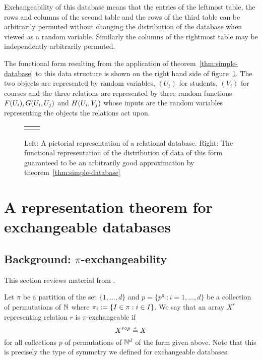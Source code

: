 Exchangeability of this database means that the entries of the leftmost table, the rows and columns of the second table and the rows of the third table can be arbitrarily permuted without changing the distribution of the database when viewed as a random variable.
Similarly the columns of the rightmost table may be independently arbitrarily permuted.

The functional form resulting from the application of theorem~\ref{thm:simple-database} to this data structure is shown on the right hand side of figure~\ref{fig:multi-rel-seq}.
The two objects are represented by \iid random variables, $(U_i)$ for students, $(V_i)$ for courses and the three relations are represented by three random functions $F(U_i),G(U_i,U_j)$ and $H(U_i,V_j)$ whose inputs are the random variables representing the objects the relations act upon.

\begin{figure}[ht]
\centering
\begin{tabular}{cc}
\tiny  & \tiny 
\end{tabular}
\caption{Left: A pictorial representation of a relational database. Right: The functional representation of the distribution of data of this form guaranteed to be an arbitrarily good approximation by theorem~\ref{thm:simple-database}}
\label{fig:multi-rel-seq}
\end{figure}

\section{A representation theorem for exchangeable databases}
\label{sec:proof_database}

\subsection{Background: $\pi$-exchangeability}

This section reviews material from \citet{Kallenberg1999-pj}.

Let $\pi$ be a partition of the set $\{1,\dots,d\}$ and $p = \{p^{\pi_i} : i = 1,\dots,d\}$ be a collection of permutations of $\mathbb{N}$ where $\pi_i := \{I \in \pi : i \in I\}$.
We say that an array $X^r$ representing relation $r$ is $\pi$-exchangeable if 
\begin{equation}
  X^{r\circ p} \overset{\,_{\!d}}{=} X
\end{equation}
for all collections $p$ of permutations of $\mathbb{N}^d$ of the form given above.
Note that this is precisely the type of symmetry we defined for exchangeable databases.

